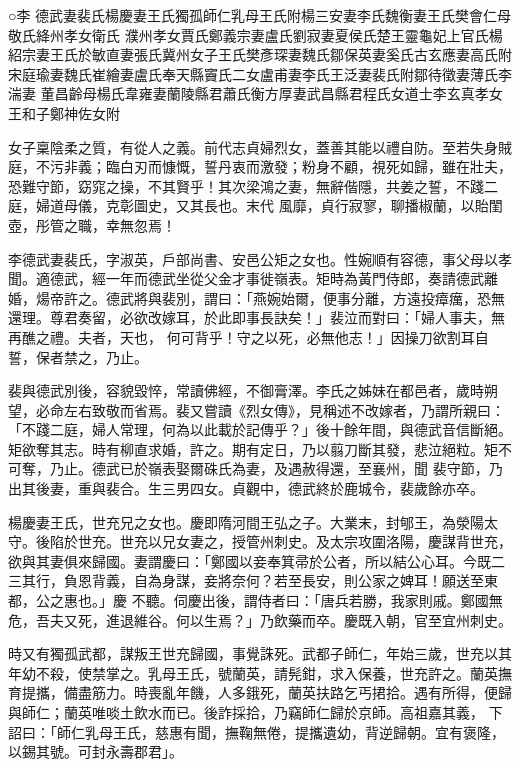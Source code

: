
\begin{pinyinscope}

 ○李
 德武妻裴氏楊慶妻王氏獨孤師仁乳母王氏附楊三安妻李氏魏衡妻王氏樊會仁母敬氏絳州孝女衛氏
 濮州孝女賈氏鄭義宗妻盧氏劉寂妻夏侯氏楚王靈龜妃上官氏楊紹宗妻王氏於敏直妻張氏冀州女子王氏樊彥琛妻魏氏鄒保英妻奚氏古玄應妻高氏附宋庭瑜妻魏氏崔繪妻盧氏奉天縣竇氏二女盧甫妻李氏王泛妻裴氏附鄒待徵妻薄氏李湍妻
 董昌齡母楊氏韋雍妻蘭陵縣君蕭氏衡方厚妻武昌縣君程氏女道士李玄真孝女王和子鄭神佐女附



 女子稟陰柔之質，有從人之義。前代志貞婦烈女，蓋善其能以禮自防。至若失身賊庭，不污非義；臨白刃而慷慨，誓丹衷而激發；粉身不顧，視死如歸，雖在壯夫，恐難守節，窈窕之操，不其賢乎！其次梁鴻之妻，無辭偕隱，共姜之誓，不踐二庭，婦道母儀，克彰圖史，又其長也。末代
 風靡，貞行寂寥，聊播椒蘭，以貽閨壺，彤管之職，幸無忽焉！



 李德武妻裴氏，字淑英，戶部尚書、安邑公矩之女也。性婉順有容德，事父母以孝聞。適德武，經一年而德武坐從父金才事徙嶺表。矩時為黃門侍郎，奏請德武離婚，煬帝許之。德武將與裴別，謂曰：「燕婉始爾，便事分離，方遠投瘴癘，恐無還理。尊君奏留，必欲改嫁耳，於此即事長訣矣！」裴泣而對曰：「婦人事夫，無再醮之禮。夫者，天也，
 何可背乎！守之以死，必無他志！」因操刀欲割耳自誓，保者禁之，乃止。



 裴與德武別後，容貌毀悴，常讀佛經，不御膏澤。李氏之姊妹在都邑者，歲時朔望，必命左右致敬而省焉。裴又嘗讀《烈女傳》，見稱述不改嫁者，乃謂所親曰：「不踐二庭，婦人常理，何為以此載於記傳乎？」後十餘年間，與德武音信斷絕。矩欲奪其志。時有柳直求婚，許之。期有定日，乃以翦刀斷其發，悲泣絕粒。矩不可奪，乃止。德武已於嶺表娶爾硃氏為妻，及遇赦得還，至襄州，聞
 裴守節，乃出其後妻，重與裴合。生三男四女。貞觀中，德武終於鹿城令，裴歲餘亦卒。



 楊慶妻王氏，世充兄之女也。慶即隋河間王弘之子。大業末，封郇王，為滎陽太守。後陷於世充。世充以兄女妻之，授管州刺史。及太宗攻圍洛陽，慶謀背世充，欲與其妻俱來歸國。妻謂慶曰：「鄭國以妾奉箕帚於公者，所以結公心耳。今既二三其行，負恩背義，自為身謀，妾將奈何？若至長安，則公家之婢耳！願送至東都，公之惠也。」慶
 不聽。伺慶出後，謂侍者曰：「唐兵若勝，我家則戚。鄭國無危，吾夫又死，進退維谷。何以生焉？」乃飲藥而卒。慶既入朝，官至宜州刺史。



 時又有獨孤武都，謀叛王世充歸國，事覺誅死。武都子師仁，年始三歲，世充以其年幼不殺，使禁掌之。乳母王氏，號蘭英，請髡鉗，求入保養，世充許之。蘭英撫育提攜，備盡筋力。時喪亂年饑，人多鋨死，蘭英扶路乞丐捃拾。遇有所得，便歸與師仁；蘭英唯啖土飲水而已。後詐採拾，乃竊師仁歸於京師。高祖嘉其義，
 下詔曰：「師仁乳母王氏，慈惠有聞，撫鞠無倦，提攜遺幼，背逆歸朝。宜有褒隆，以錫其號。可封永壽郡君」。




\end{pinyinscope}
